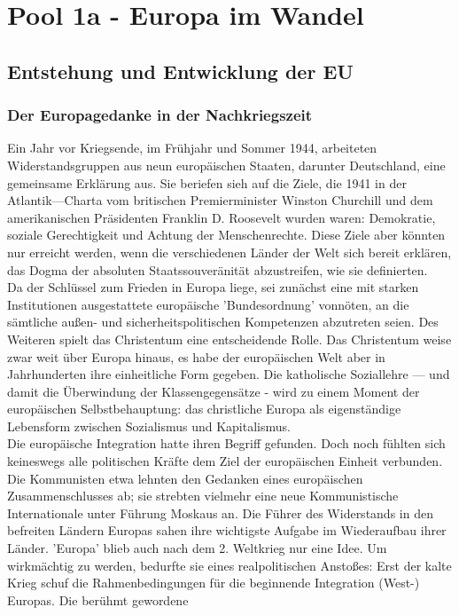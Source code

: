 \documentclass[letterpaper, 12pt]{article}
\let\tempsection\section
\renewcommand\section[1]{\vspace{-0.3cm}\tempsection{#1}\vspace{-0.3cm}}
\let\tempsubsection\subsection
\renewcommand\subsection[1]{\vspace{0cm}\tempsubsection{#1}\vspace{0cm}}
\let\tempsubsubsection\subsubsection
\renewcommand\subsubsection[1]{\vspace{0cm}\tempsubsubsection{#1}\vspace{0cm}}
\begin{document}
\parindent 0pt
\parskip 6pt



\clearpage
\thispagestyle{empty}
\tableofcontents

\newpage
{}
\pagestyle{fancy}


\section{Pool 1a - Europa im Wandel \cite{buch}}

\subsection{Entstehung und Entwicklung der EU}

\subsubsection{Der Europagedanke in der Nachkriegszeit}

Ein Jahr vor
Kriegsende, im Frühjahr und Sommer 1944, arbeiteten Widerstandsgruppen aus neun europäischen Staaten, darunter
Deutschland, eine gemeinsame Erklärung aus. Sie beriefen sieh
auf die Ziele, die 1941 in der Atlantik—Charta vom britischen
Premierminister Winston Churchill und dem amerikanischen
Präsidenten Franklin D. Roosevelt wurden waren: Demokratie, soziale Gerechtigkeit und Achtung der Menschenrechte. Diese Ziele aber könnten nur erreicht werden, wenn die verschiedenen Länder der Welt sich bereit erklären, das Dogma der absoluten Staatssouveränität abzustreifen, wie sie definierten. \\
Da der Schlüssel zum Frieden in Europa liege, sei zunächst eine mit starken Institutionen ausgestattete europäische 'Bundesordnung' vonnöten, an die sämtliche außen- und sicherheitspolitischen Kompetenzen abzutreten seien. Des Weiteren spielt das Christentum eine entscheidende Rolle. Das Christentum weise zwar weit über Europa hinaus, es habe der europäischen Welt aber in Jahrhunderten ihre einheitliche Form gegeben. Die katholische Soziallehre — und damit die Überwindung der Klassengegensätze - wird zu einem Moment der europäischen Selbstbehauptung: das christliche Europa als eigenständige Lebensform zwischen Sozialismus und Kapitalismus. \\
Die europäische Integration hatte ihren Begriff gefunden.
Doch noch fühlten sich keineswegs alle politischen Kräfte dem Ziel der europäischen Einheit verbunden. Die Kommunisten etwa lehnten den Gedanken eines europäischen Zusammenschlusses ab; sie strebten vielmehr eine neue Kommunistische Internationale unter Führung Moskaus an. Die Führer des Widerstands in den befreiten Ländern Europas sahen ihre wichtigste Aufgabe im Wiederaufbau ihrer Länder. 'Europa' blieb auch nach dem 2. Weltkrieg nur eine Idee. Um wirkmächtig zu werden, bedurfte sie eines realpolitischen Anstoßes: Erst der kalte Krieg schuf die Rahmenbedingungen für die beginnende Integration (West-) Europas. Die berühmt gewordene 

\clearpage


\end{document}
